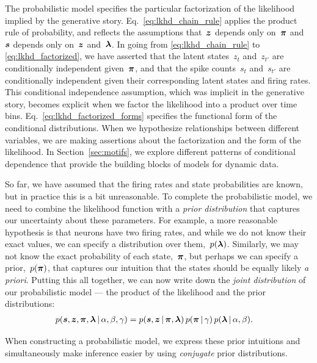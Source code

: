 The probabilistic model specifies the particular factorization of the
likelihood implied by the generative story.
Eq.~\ref{eq:lkhd_chain_rule} applies the product rule of
probability, and reflects the assumptions that~$\boldsymbol{z}$ depends only on~$\boldsymbol{\pi}$
and~$\boldsymbol{s}$ depends only on~$\boldsymbol{z}$ and~$\boldsymbol{\lambda}$. 
In going from \eqref{eq:lkhd_chain_rule} to
\eqref{eq:lkhd_factorized}, we have asserted that the latent
states~$z_t$ and~$z_{t'}$ are conditionally independent given~$\boldsymbol{\pi}$,
and that the spike counts~$s_{t}$ and~$s_{t'}$ are conditionally
independent given their corresponding latent states and firing rates. This conditional
independence assumption, which was implicit in the generative story,
becomes explicit when we factor the likelihood into a product over
time bins.  Eq.~\ref{eq:lkhd_factorized_forms} specifies the
functional form of the conditional distributions.  When we hypothesize
relationships between different variables, we are making assertions
about the factorization and the form of the likelihood.  In
Section~\ref{sec:motifs}, we explore different patterns of conditional
dependence that provide the building blocks of models for dynamic
data.

So far, we have assumed that the firing rates and state probabilities are known, but in practice 
this is a bit unreasonable. To complete the probabilistic model, we need 
to combine the likelihood function with a \emph{prior distribution} that 
captures our uncertainty about these parameters. 
For example, a more reasonable hypothesis is that neurons have 
two firing rates, and while we do not know their exact values, we can 
specify a distribution over them,~$p(\boldsymbol{\lambda})$. Similarly, we may not know 
the exact probability of each state,~$\boldsymbol{\pi}$, but perhaps we can specify 
a prior,~$p(\boldsymbol{\pi})$, that captures our intuition that the states should
be equally likely \emph{a priori}.
Putting this all together, we can now write down the \emph{joint
  distribution} of our probabilistic model --- the
product of the likelihood and the prior distributions:
\begin{align}
  \label{eq:full_joint}
  p(\boldsymbol{s}, \boldsymbol{z}, \boldsymbol{\pi}, \boldsymbol{\lambda} \,|\, \alpha, \beta, \gamma) 
  &= p(\boldsymbol{s}, \boldsymbol{z} \,|\, \boldsymbol{\pi}, \boldsymbol{\lambda}) \,
  p(\boldsymbol{\pi} \,|\, \gamma) \, 
     p(\boldsymbol{\lambda} \,|\, \alpha, \beta).
\end{align}

When constructing a probabilistic model, we express these prior
intuitions and simultaneously make inference easier by using
\emph{conjugate} prior distributions.


